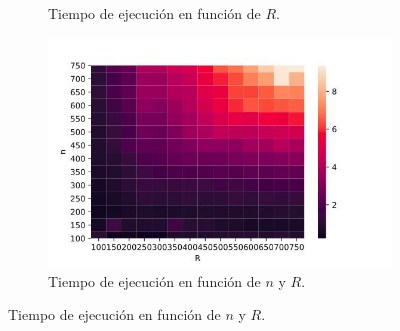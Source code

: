 \documentclass[10pt,a4paper]{article}
\begin{document}
\begin{figure}[h!]
\begin{subfigure}{0.45\linewidth}
		\caption{Tiempo de ejecución en función de $R$.}
		\label{fig:dp-R}
	\end{subfigure}
	\begin{subfigure}{0.45\linewidth}
		\centering
		\includegraphics[scale=0.35]{img/dp-heatmap.jpg}
		\caption{Tiempo de ejecución en función de $n$ y $R$.}
		\label{fig:dp-NR}
	\end{subfigure}
	\label{fig:exp-pd}
\end{figure}
\end{document}
